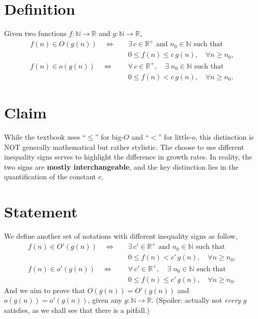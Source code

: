 \documentclass[12pt]{article}
\begin{document}
\section*{Definition}

Given two functions \(f : \mathbb{N} \to \mathbb{R}\) and \(g : \mathbb{N} \to \mathbb{R}\),
\begin{align*} 
    f(n) \in O(g(n)) \quad \Longleftrightarrow \quad & \exists \, c \in \mathbb{R}^+ \text{ and } n_0  \in \mathbb{N} \text{ such that} \\
    & 0 \leq f(n) \leq c \, g(n), \quad \forall n \geq n_0, \\
    f(n) \in o(g(n)) \quad \Longleftrightarrow \quad & \forall \, c \in \mathbb{R}^+, \quad \exists \; n_0 \in \mathbb{N} \text{ such that} \\
    & 0 \leq f(n) < c \, g(n), \quad \forall n \geq n_0.
\end{align*}

\section*{Claim}

While the textbook uses ``\(\leq\)'' for big-\(O\) and ``\(<\)'' for little-\(o\), this distinction is NOT generally mathematical but rather stylistic. The choose to use different inequality signs serves to highlight the difference in growth rates. In reality, the two signs are \textbf{mostly interchangeable}, and the key distinction lies in the quantification of the constant \(c\).

\section*{Statement}

We define another set of notations with different inequality signs as follow,
\begin{align*} 
    f(n) \in O'(g(n)) \quad \Longleftrightarrow \quad & \exists \, c' \in \mathbb{R}^+ \text{ and } n_0  \in \mathbb{N} \text{ such that} \\
    & 0 \leq f(n) < c' \, g(n), \quad \forall n \geq n_0, \\
    f(n) \in o'(g(n)) \quad \Longleftrightarrow \quad & \forall \, c' \in \mathbb{R}^+, \quad \exists \; n_0 \in \mathbb{N} \text{ such that} \\
    & 0 \leq f(n) \leq c' \, g(n), \quad \forall n \geq n_0.
\end{align*}
And we aim to prove that \(O(g(n)) = O'(g(n))\) and \(o(g(n)) = o'(g(n))\), given any \(g: \mathbb{N} \to \mathbb{R}\). (Spoiler: actually not \textit{every} \(g\) satisfies, as we shall see that there is a pitfall.)
\end{document}
